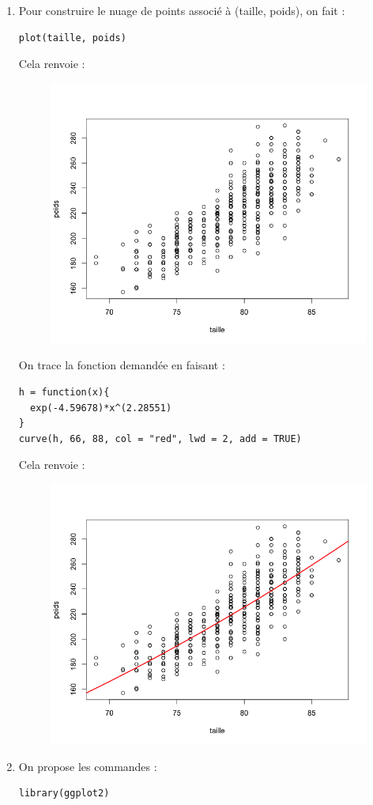 \begin{enumerate}
\item Pour construire le nuage de points associé à (taille, poids), on fait :
\begin{lstlisting}[language=html]
plot(taille, poids)
\end{lstlisting}
Cela renvoie :
\begin{figure}[H]\begin{center}\includegraphics[scale=0.4]{ilu/gra88.png}\end{center}\end{figure}
On trace la fonction demandée en faisant :
\begin{lstlisting}[language=html]
h = function(x){
  exp(-4.59678)*x^(2.28551)
}
curve(h, 66, 88, col = "red", lwd = 2, add = TRUE)
\end{lstlisting}
Cela renvoie :
\begin{figure}[H]\begin{center}\includegraphics[scale=0.4]{ilu/gra89.png}\end{center}\end{figure}
\item On propose les commandes :
\begin{lstlisting}[language=html]
library(ggplot2)


\end{lstlisting}
\end{enumerate}
